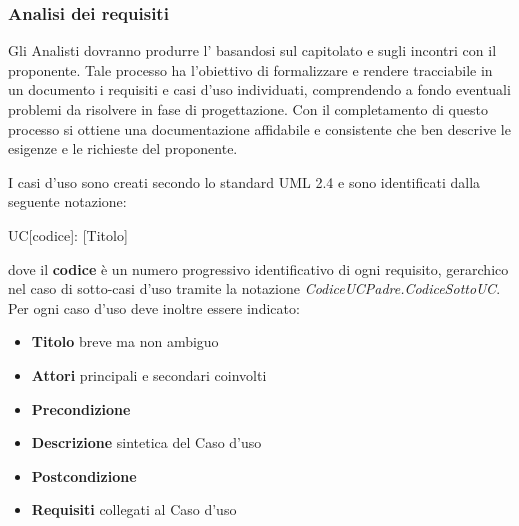 \documentclass[12pt,a4paper]{article}
\begin{document}
\subsubsection{Analisi dei requisiti}
Gli Analisti dovranno produrre l'\AdR{} basandosi sul capitolato e sugli incontri con il proponente. Tale processo ha l'obiettivo di formalizzare e rendere tracciabile in un documento i requisiti e casi d'uso individuati, comprendendo a fondo eventuali problemi da risolvere in fase di progettazione. Con il completamento di questo processo si ottiene una documentazione affidabile e consistente che ben descrive le esigenze e le richieste del proponente.

I casi d'uso sono creati secondo lo standard UML 2.4 e sono identificati dalla seguente notazione:
\begin{center}
	UC[codice]: [Titolo]
\end{center}
dove il \textbf{codice} è un numero progressivo identificativo di ogni requisito, gerarchico nel  caso di sotto-casi d'uso tramite la notazione \textit{CodiceUCPadre.CodiceSottoUC}. Per ogni caso d'uso deve inoltre essere indicato:
\begin{itemize}
	\item \textbf{Titolo} breve ma non ambiguo
	\item \textbf{Attori} principali e secondari coinvolti
	\item \textbf{Precondizione}
	\item \textbf{Descrizione} sintetica del Caso d'uso
	\item \textbf{Postcondizione}
	\item \textbf{Requisiti} collegati al Caso d'uso
\end{itemize}
\end{document}
